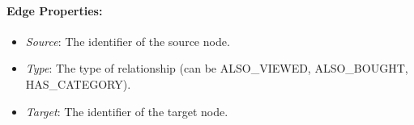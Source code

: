 \paragraph{Edge Properties:}
\begin{itemize}
    \item \emph{Source}: The identifier of the source node.
    \item \emph{Type}: The type of relationship (can be ALSO\_VIEWED, ALSO\_BOUGHT, HAS\_CATEGORY).
    \item \emph{Target}: The identifier of the target node.
\end{itemize}